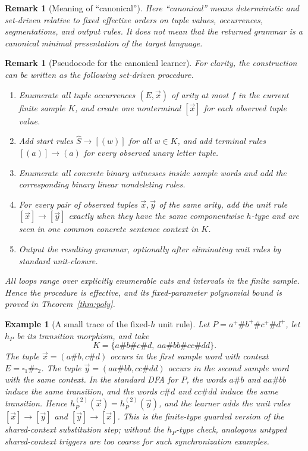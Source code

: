 \documentclass[11pt,a4paper]{article}
\newtheorem{remark}[theorem]{Remark}
\newtheorem{example}[theorem]{Example}
\theoremstyle{remark}
\newcommand{\tuple}[1]{\vec{#1}}
\newcommand{\blank}{\square}
\begin{document}
\begin{remark}[Meaning of ``canonical'']
\label{rem:canonical-meaning}
Here ``canonical'' means deterministic and set-driven relative to fixed
effective orders on tuple values, occurrences, segmentations, and output
rules.  It does not mean that the returned grammar is a canonical minimal
presentation of the target language.
\end{remark}

\begin{remark}[Pseudocode for the canonical learner]
\label{rem:learner-pseudocode}
For clarity, the construction can be written as the following set-driven
procedure.
\begin{enumerate}[label=\textnormal{Step \arabic*.},leftmargin=*]
\item Enumerate all tuple occurrences \((E,\tuple x)\) of arity at most \(f\) in
the current finite sample \(K\), and create one nonterminal \([\tuple x]\) for
each observed tuple value.
\item Add start rules \(\widehat S\to[(w)]\) for all \(w\in K\), and add terminal
rules \([(a)]\to(a)\) for every observed unary letter tuple.
\item Enumerate all concrete binary witnesses inside sample words and add the
corresponding binary linear nondeleting rules.
\item For every pair of observed tuples \(\tuple x,\tuple y\) of the same arity,
add the unit rule \([\tuple x]\to[\tuple y]\) exactly when they have the same
componentwise \(h\)-type and are seen in one common concrete sentence context in
\(K\).
\item Output the resulting grammar, optionally after eliminating unit rules by
standard unit-closure.
\end{enumerate}
All loops range over explicitly enumerable cuts and intervals in the finite
sample.  Hence the procedure is effective, and its fixed-parameter polynomial
bound is proved in Theorem~\ref{thm:poly}.
\end{remark}

\begin{example}[A small trace of the fixed-\(h\) unit rule]
\label{ex:learner-trace}
Let \(P=a^+\#b^+\#c^+\#d^+\), let \(h_P\) be its transition morphism, and take
\[
  K=\{a\#b\#c\#d,\ aa\#bb\#cc\#dd\}.
\]
The tuple \(\tuple x=(a\#b,c\#d)\) occurs in the first sample word with context
\(E=\blank_1\#\blank_2\).  The tuple
\(\tuple y=(aa\#bb,cc\#dd)\) occurs in the second sample word with the same
context.  In the standard DFA for \(P\), the words \(a\#b\) and \(aa\#bb\)
induce the same transition, and the words \(c\#d\) and \(cc\#dd\) induce the
same transition.  Hence
\(h_P^{(2)}(\tuple x)=h_P^{(2)}(\tuple y)\), and the learner adds the unit rules
\([\tuple x]\to[\tuple y]\) and \([\tuple y]\to[\tuple x]\).  This is the
finite-type guarded version of the shared-context substitution step; without the
\(h_P\)-type check, analogous untyped shared-context triggers are too coarse
for such synchronization examples.
\end{example}
\end{document}
